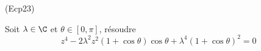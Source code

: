 \begin{tiny}(Ecp23)\end{tiny}
Soit $\lambda\in \C$ et $\theta \in [0,\pi]$, résoudre
\begin{displaymath}
 z^4-2\lambda^2 z^2(1+\cos \theta)\cos \theta + \lambda^4 (1+\cos \theta)^2 = 0
\end{displaymath}
